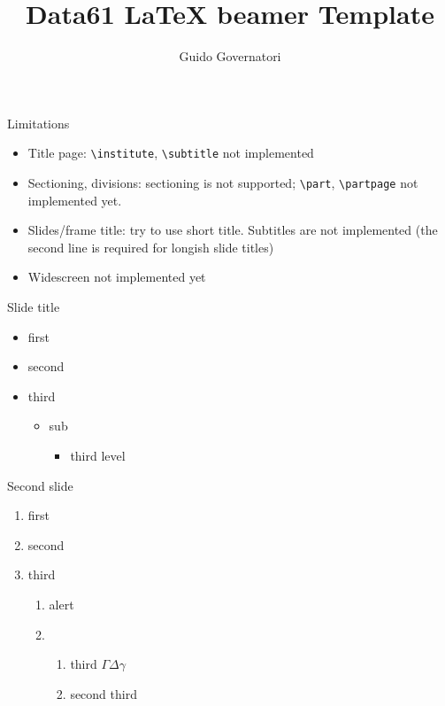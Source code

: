 \documentclass{beamer}
\title{Data61 \LaTeX{} beamer Template}
\author{Guido Governatori}
\begin{document}
\maketitle

\begin{frame}[fragile]{Limitations}
	\begin{itemize}
		\item Title page: \verb|\institute|, \verb|\subtitle| not implemented
		\item Sectioning, divisions: sectioning is not supported; \verb|\part|, \verb|\partpage| 
				not implemented yet.
		\item Slides/frame title: try to use short title. Subtitles are not implemented (the second 
		    line is required for longish slide titles) 
		\item Widescreen not implemented yet
	\end{itemize}
\end{frame}

\begin{frame}{Slide title}
  \begin{itemize}
    \item first
    \item second
    \item third
    \begin{itemize}
      \item sub
			\begin{itemize}
				\item third level
			\end{itemize}
    \end{itemize}
  \end{itemize}
\end{frame}

\begin{frame}{Second slide}
  \begin{enumerate}
    \item first
    \item second
    \item third
    \begin{enumerate}
      \item \alert{alert} 
      \item {}
			\begin{enumerate}
				\item third $\Gamma\Delta\gamma$
				\item second third
			\end{enumerate}
    \end{enumerate}
  \end{enumerate}
\end{frame}

\end{document}
